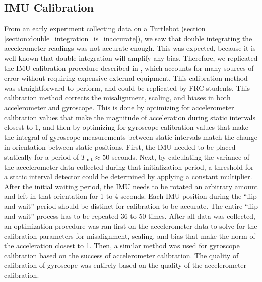 \documentclass{article}
\begin{document}
  \subsection{IMU Calibration} \label{section:imu_calibration}

    From an early experiment collecting data on a Turtlebot (section \ref{section:double_integration_is_inaccurate}), we saw that double integrating the accelerometer readings was not accurate enough. This was expected, because it is well known that double integration will amplify any bias. Therefore, we replicated the IMU calibration procedure described in \cite{tedaldi_robust_2014}, which accounts for many sources of error without requiring expensive external equipment. This calibration method was straightforward to perform, and could be replicated by FRC students. This calibration method corrects the misalignment, scaling, and biases in both accelerometer and gyroscope. This is done by optimizing for accelerometer calibration values that make the magnitude of acceleration during static intervals closest to 1, and then by optimizing for gyroscope calibration values that make the integral of gyroscope measurements between static intervals match the change in orientation between static positions. First, the IMU needed to be placed statically for a period of $T_{\text{init}}\approx50$ seconds. Next, by calculating the variance of the accelerometer data collected during that initialization period, a threshold for a static interval detector could be determined by applying a constant multiplier. After the initial waiting period, the IMU needs to be rotated an arbitrary amount and left in that orientation for 1 to 4 seconds. Each IMU position during the ``flip and wait'' period should be distinct for calibration to be accurate. The entire ``flip and wait'' process has to be repeated 36 to 50 times. After all data was collected, an optimization procedure was ran first on the accelerometer data to solve for the calibration parameters for misalignment, scaling, and bias that make the norm of the acceleration closest to 1. Then, a similar method was used for gyroscope calibration based on the success of accelerometer calibration. The quality of calibration of gyroscope was entirely based on the quality of the accelerometer calibration.
\end{document}
